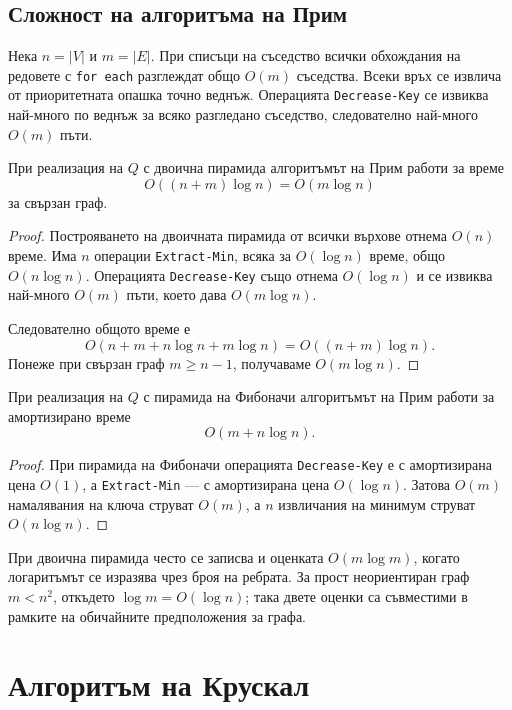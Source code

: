 \subsection{Сложност на алгоритъма на Прим}\label{s:7.3.6}

Нека $n=|V|$ и $m=|E|$. При списъци на съседство всички обхождания на редовете с \verb|for each| разглеждат общо $O(m)$ съседства. Всеки връх се извлича от приоритетната опашка точно веднъж. Операцията \verb|Decrease-Key| се извиква най-много по веднъж за всяко разгледано съседство, следователно най-много $O(m)$ пъти.

\begin{prop}
При реализация на $Q$ с двоична пирамида алгоритъмът на Прим работи за време
\[
O((n+m)\log n)=O(m\log n)
\]
за свързан граф.
\end{prop}

\begin{proof}
Построяването на двоичната пирамида от всички върхове отнема $O(n)$ време. Има $n$ операции \verb|Extract-Min|, всяка за $O(\log n)$ време, общо $O(n\log n)$. Операцията \verb|Decrease-Key| също отнема $O(\log n)$ и се извиква най-много $O(m)$ пъти, което дава $O(m\log n)$.

Следователно общото време е
\[
O(n+m+n\log n+m\log n)=O((n+m)\log n).
\]
Понеже при свързан граф $m\geq n-1$, получаваме $O(m\log n)$.
\end{proof}

\begin{prop}
При реализация на $Q$ с пирамида на Фибоначи алгоритъмът на Прим работи за амортизирано време
\[
O(m+n\log n).
\]
\end{prop}

\begin{proof}
При пирамида на Фибоначи операцията \verb|Decrease-Key| е с амортизирана цена $O(1)$, а \verb|Extract-Min| --- с амортизирана цена $O(\log n)$. Затова $O(m)$ намалявания на ключа струват $O(m)$, а $n$ извличания на минимум струват $O(n\log n)$.
\end{proof}

\begin{remark}
При двоична пирамида често се записва и оценката $O(m\log m)$, когато логаритъмът се изразява чрез броя на ребрата. За прост неориентиран граф $m< n^2$, откъдето $\log m=O(\log n)$; така двете оценки са съвместими в рамките на обичайните предположения за графа.
\end{remark}

\section{Алгоритъм на Крускал}\label{s:7.4}

